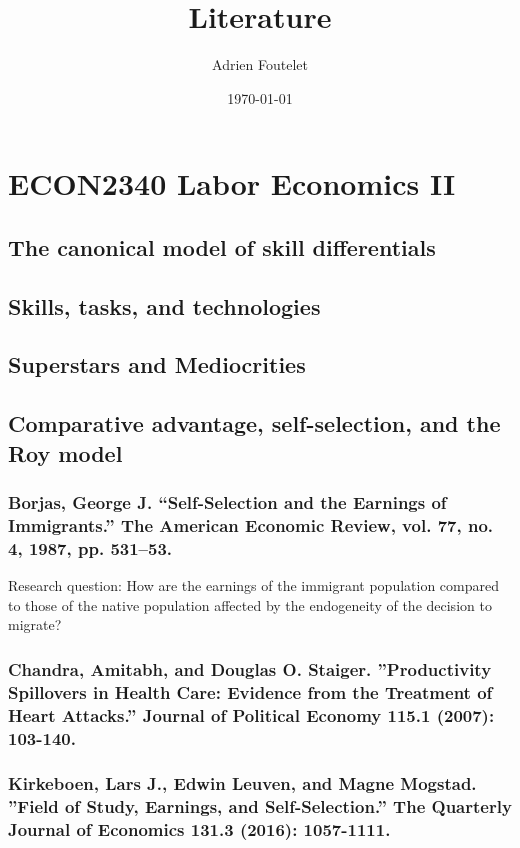\documentclass{article}
\title{Literature
}
\author{Adrien Foutelet}
\date{\today}
\begin{document}
\maketitle

\section{ECON2340 Labor Economics II}

\subsection{The canonical model of skill differentials}

\subsection{Skills, tasks, and technologies}

\subsection{Superstars and Mediocrities}

\subsection{Comparative advantage, self-selection, and the Roy model}

\subsubsection{Borjas, George J. “Self-Selection and the Earnings of Immigrants.” The American Economic
Review, vol. 77, no. 4, 1987, pp. 531–53.}

Research question: How are the earnings of the immigrant population compared to those of the native population affected by the endogeneity of the decision to migrate?



\subsubsection{Chandra, Amitabh, and Douglas O. Staiger. ”Productivity Spillovers in Health Care: Evidence
from the Treatment of Heart Attacks.” Journal of Political Economy 115.1 (2007): 103-140.}

\subsubsection{Kirkeboen, Lars J., Edwin Leuven, and Magne Mogstad. ”Field of Study, Earnings, and
Self-Selection.” The Quarterly Journal of Economics 131.3 (2016): 1057-1111.}
\end{document}
